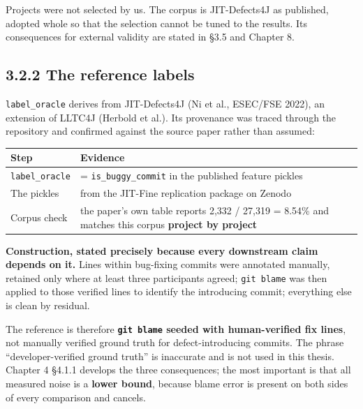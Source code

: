 Projects were not selected by us. The corpus is JIT-Defects4J as
published, adopted whole so that the selection cannot be tuned to the
results. Its consequences for external validity are stated in \S{}3.5 and
Chapter 8.

\subsection{3.2.2 The reference labels}\label{the-reference-labels}

\texttt{label\_oracle} derives from JIT-Defects4J (Ni et al., ESEC/FSE
2022), an extension of LLTC4J (Herbold et al.). Its provenance was
traced through the repository and confirmed against the source paper
rather than assumed:

\begin{longtable}[]{@{}
  >{\raggedright\arraybackslash}p{}
  >{\raggedright\arraybackslash}p{}@{}}
\toprule\noalign{}
\begin{minipage}[b]{\linewidth}\raggedright
Step
\end{minipage} & \begin{minipage}[b]{\linewidth}\raggedright
Evidence
\end{minipage} \\
\midrule\noalign{}
\endhead
\bottomrule\noalign{}
\endlastfoot
\texttt{label\_oracle} & = \texttt{is\_buggy\_commit} in the published
feature pickles \\
The pickles & from the JIT-Fine replication package on Zenodo \\
Corpus check & the paper's own table reports 2,332 / 27,319 = 8.54\% and
matches this corpus \textbf{project by project} \\
\end{longtable}

\textbf{Construction, stated precisely because every downstream claim
depends on it.} Lines within bug-fixing commits were annotated manually,
retained only where at least three participants agreed;
\texttt{git\ blame} was then applied to those verified lines to identify
the introducing commit; everything else is clean by residual.

The reference is therefore \textbf{\texttt{git\ blame} seeded with
human-verified fix lines}, not manually verified ground truth for
defect-introducing commits. The phrase ``developer-verified ground
truth'' is inaccurate and is not used in this thesis. Chapter 4 \S{}4.1.1
develops the three consequences; the most important is that all measured
noise is a \textbf{lower bound}, because blame error is present on both
sides of every comparison and cancels.

